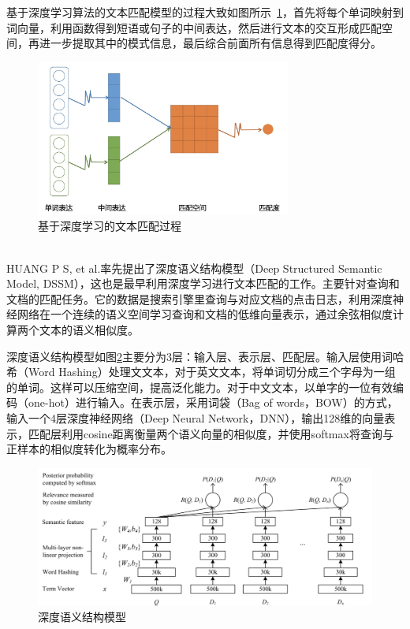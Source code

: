 基于深度学习算法的文本匹配模型的过程大致如图所示~\ref{fig:deep_text_matching}，首先将每个单词映射到词向量，利用函数得到短语或句子的中间表达，然后进行文本的交互形成匹配空间，再进一步提取其中的模式信息，最后综合前面所有信息得到匹配度得分。~\\
\begin{figure}[htbp!]
\centering
\includegraphics[width=0.75\textwidth]{figures/DeepTextMatching.jpg}
\caption{基于深度学习的文本匹配过程}\label{fig:deep_text_matching}
\vspace{-1em}
\end{figure}
~\\HUANG P S, et al.率先提出了深度语义结构模型\cite{Huang2013LearningDS}（Deep Structured Semantic Model, DSSM），这也是最早利用深度学习进行文本匹配的工作。主要针对查询和文档的匹配任务。它的数据是搜索引擎里查询与对应文档的点击日志，利用深度神经网络在一个连续的语义空间学习查询和文档的低维向量表示，通过余弦相似度计算两个文本的语义相似度。

深度语义结构模型如图\ref{fig:DSSM}主要分为3层：输入层、表示层、匹配层。输入层使用词哈希（Word Hashing）处理文文本，对于英文文本，将单词切分成三个字母为一组的单词。这样可以压缩空间，提高泛化能力。对于中文文本，以单字的一位有效编码（one-hot）进行输入。在表示层，采用词袋（Bag of words，BOW）的方式，输入一个4层深度神经网络\cite{hinton2006fast}（Deep Neural Network，DNN），输出128维的向量表示，匹配层利用cosine距离衡量两个语义向量的相似度，并使用softmax将查询与正样本的相似度转化为概率分布。

\begin{figure}[htbp!]
\vspace{1em}
\centering
\includegraphics[width=1.0\linewidth]{figures/DSSM.png}
\caption{深度语义结构模型}\label{fig:DSSM}
\vspace{1em}
\end{figure}


